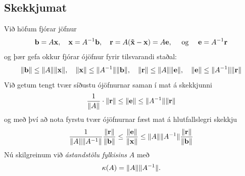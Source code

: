 \documentclass[letterpaper,10pt,icelandic]{sphinxmanual}
\begin{document}
\subsection{Skekkjumat}
\label{kafli08:index-14}\label{kafli08:skekkjumat}
Við höfum fjórar jöfnur
\begin{gather}
\begin{split}\mbox{${\bf b}$}=A\mbox{${\bf x}$}, \quad \mbox{${\bf x}$}=A^{-1}\mbox{${\bf b}$}, \quad
\mbox{${\bf r}$}=A(\mathbf{\tilde x}-\mbox{${\bf x}$})=A\mbox{${\bf e}$}, \quad \text{ og } \quad
\mbox{${\bf e}$}=A^{-1}\mbox{${\bf r}$}\end{split}\notag
\end{gather}
og þær gefa okkur fjórar ójöfnur fyrir tilsvarandi staðal:
\begin{gather}
\begin{split}\|\mbox{${\bf b}$}\|\leq \|A\|\|\mbox{${\bf x}$}\|, \quad  \|\mbox{${\bf x}$}\|\leq \|A^{-1}\|\|\mbox{${\bf b}$}\|,
\quad
\|\mbox{${\bf r}$}\|\leq \|A\|\|\mbox{${\bf e}$}\|, \quad  \|\mbox{${\bf e}$}\|\leq \|A^{-1}\|\|\mbox{${\bf r}$}\|\end{split}\notag
\end{gather}
Við getum tengt tvær síðustu ójöfnurnar saman í mat á skekkjunni
\begin{gather}
\begin{split}\dfrac 1{\|A\|}\cdot  \|\mbox{${\bf r}$}\|
\leq  \|\mbox{${\bf e}$}\| \leq
\|A^{-1}\| \|\mbox{${\bf r}$}\|\end{split}\notag
\end{gather}
og með því að nota fyrstu tvær ójöfnurnar fæst mat á hlutfallslegri
skekkju
\begin{gather}
\begin{split}\dfrac 1{\|A\|\|A^{-1}\|}\dfrac{ \|\mbox{${\bf r}$}\|}{\|\mbox{${\bf b}$}\|}
\leq \dfrac{\|\mbox{${\bf e}$}\|}{\|\mbox{${\bf x}$}\|} \leq
\|A\|\|A^{-1}\|\dfrac{\|\mbox{${\bf r}$}\|}{\|\mbox{${\bf b}$}\|}\end{split}\notag
\end{gather}
Nú skilgreinum við \emph{ástandstölu fylkisins} \(A\) með
\begin{gather}
\begin{split}\kappa(A)=\|A\|\|A^{-1}\|.\end{split}\notag
\end{gather}
\end{document}
